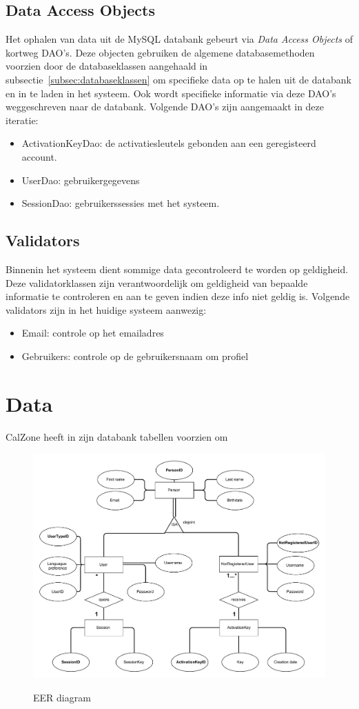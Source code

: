 \subsection{Data Access Objects}
\label{subsec:dao}

Het ophalen van data uit de MySQL databank gebeurt via \emph{Data Access Objects} of kortweg DAO's. 
Deze objecten gebruiken de algemene databasemethoden voorzien door de databaseklassen aangehaald in subsectie~\ref{subsec:databaseklassen} om specifieke data op te halen uit de databank en in te laden in het systeem. 
Ook wordt specifieke informatie via deze DAO's weggeschreven naar de databank. 
Volgende DAO's zijn aangemaakt in deze iteratie:

\begin{itemize}
	\item ActivationKeyDao: de activatiesleutels gebonden aan een geregisteerd account. 
	\item UserDao: gebruikergegevens
	\item SessionDao: gebruikerssessies met het systeem.
\end{itemize}

\subsection{Validators}
\label{subsec:validators}

Binnenin het systeem dient sommige data gecontroleerd te worden op geldigheid. 
Deze validatorklassen zijn verantwoordelijk om geldigheid van bepaalde informatie te controleren en aan te geven indien deze info niet geldig is. 
Volgende validators zijn in het huidige systeem aanwezig:

\begin{itemize}
	\item Email: controle op het emailadres
	\item Gebruikers: controle op de gebruikersnaam om profiel
\end{itemize}

\section{Data}
\label{sec:data}

CalZone heeft in zijn databank tabellen voorzien om 

\begin{figure}[H]
	\centering
	\includegraphics[scale=0.5]{design/EERIT1.pdf}
	\label{fig:EER}
	\caption{EER diagram}
\end{figure}